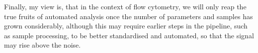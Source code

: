 Finally, my view is, that in the context of flow cytometry, we will only reap the true fruits of automated analysis once the number of parameters and samples has grown considerably, although this may require earlier steps in the pipeline, such as sample processing, to be better standardised and automated, so that the signal may rise above the noise.




%
%









